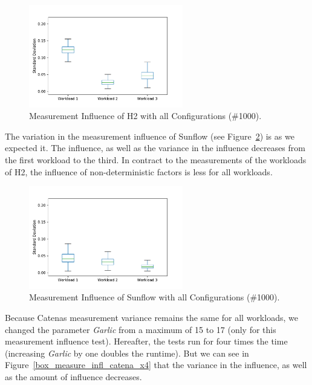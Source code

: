 \begin{figure}
  \centering
  \includegraphics[width=0.6\textwidth]{images/h2_m_infl_wl_012}
  \caption{Measurement Influence of H2 with all Configurations (\#1000).}
  \label{box_measure_infl_h2}
\end{figure}

The variation in the measurement influence of Sunflow (see Figure~\ref{box_measure_infl_sunflow}) is as we expected it. The influence, as well as the variance in the influence decreases from the first workload to the third. In contract to the measurements of the workloads of H2, the influence of non-deterministic factors is less for all workloads.

\begin{figure}
  \centering
  \includegraphics[width=0.6\textwidth]{images/sunflow_m_infl_wl_012}
  \caption{Measurement Influence of Sunflow with all Configurations (\#1000).}
  \label{box_measure_infl_sunflow}
\end{figure}

Because Catenas measurement variance remains the same for all workloads, we changed the parameter \textit{Garlic} from a maximum of 15 to 17 (only for this measurement influence test). Hereafter, the tests run for four times the time (increasing \textit{Garlic} by one doubles the runtime). But we can see in Figure~\ref{box_measure_infl_catena_x4} that the variance in the influence, as well as the amount of influence decreases. 

